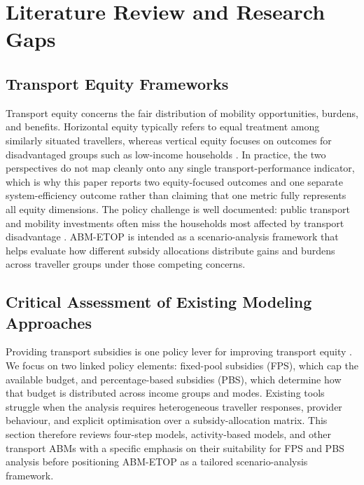 \documentclass[a4paper,fleqn]{cas-sc}
\begin{document}
\section{Literature Review and Research Gaps}\label{sec:lit}

\subsection{Transport Equity Frameworks}
Transport equity concerns the fair distribution of mobility opportunities, burdens, and benefits. Horizontal equity typically refers to equal treatment among similarly situated travellers, whereas vertical equity focuses on outcomes for disadvantaged groups such as low-income households \citep{Litman2025, vanWee2011}. In practice, the two perspectives do not map cleanly onto any single transport-performance indicator, which is why this paper reports two equity-focused outcomes and one separate system-efficiency outcome rather than claiming that one metric fully represents all equity dimensions. The policy challenge is well documented: public transport and mobility investments often miss the households most affected by transport disadvantage \citep{Allen2019, Titheridge2014, Lucas2012}. ABM-ETOP is intended as a scenario-analysis framework that helps evaluate how different subsidy allocations distribute gains and burdens across traveller groups under those competing concerns.

\subsection{Critical Assessment of Existing Modeling Approaches}\label{sec:model_critique}

Providing transport subsidies is one policy lever for improving transport equity \citep{Lucas2016}. We focus on two linked policy elements: fixed-pool subsidies (FPS), which cap the available budget, and percentage-based subsidies (PBS), which determine how that budget is distributed across income groups and modes. Existing tools struggle when the analysis requires heterogeneous traveller responses, provider behaviour, and explicit optimisation over a subsidy-allocation matrix. This section therefore reviews four-step models, activity-based models, and other transport ABMs with a specific emphasis on their suitability for FPS and PBS analysis before positioning ABM-ETOP as a tailored scenario-analysis framework.
\end{document}
